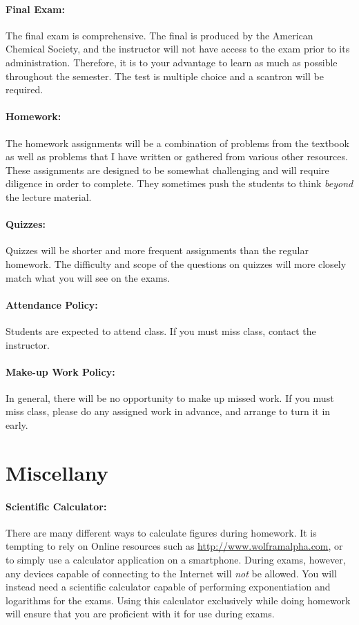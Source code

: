 \documentclass[12pt, letterpaper]{article}
\begin{document}
\paragraph{Final Exam:}
The final exam is comprehensive. The final is produced by the American Chemical Society, and the instructor will not have access to the exam prior to its administration. Therefore, it is to your advantage to learn as much as possible throughout the semester. The test is multiple choice and a scantron will be required.

\paragraph{Homework:}
The homework assignments will be a combination of problems from the textbook as well as problems that I have written or gathered from various other resources. These assignments are designed to be somewhat challenging and will require diligence in order to complete. They sometimes push the students to think \emph{beyond} the lecture material.

\paragraph{Quizzes:}
Quizzes will be shorter and more frequent assignments than the regular homework. The difficulty and scope of the questions on quizzes will more closely match what you will see on the exams.

\paragraph{Attendance Policy:}
Students are expected to attend class. If you must miss class, contact the instructor.

\paragraph{Make-up Work Policy:}
In general, there will be no opportunity to make up missed work. If you must miss class, please do any assigned work in advance, and arrange to turn it in early.

\section*{Miscellany}

\paragraph{Scientific Calculator:}
There are many different ways to calculate figures during homework. It is tempting to rely on Online resources such as \href{http://www.wolframalpha.com}{http://www.wolframalpha.com}, or to simply use a calculator application on a smartphone. During exams, however, any devices capable of connecting to the Internet will \emph{not} be allowed. You will instead need a scientific calculator capable of performing exponentiation and logarithms for the exams. Using this calculator exclusively while doing homework will ensure that you are proficient with it for use during exams.
\end{document}
